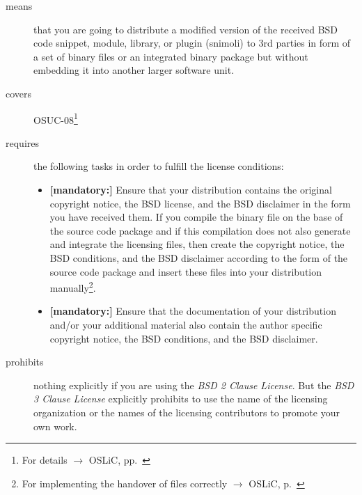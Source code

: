 \begin{description}
\item[means] that you are going to distribute a modified version of the received
BSD code snippet, module, library, or plugin (snimoli) to 3rd parties in form
of a set of binary files or an integrated binary package but without embedding
it into another larger software unit.
\item[covers] OSUC-08\footnote{For details $\rightarrow$ OSLiC, pp.\ \pageref{OSUC-08-DEF}}
\item[requires] the following tasks in order to fulfill the license conditions:
\begin{itemize}
   \item  \textbf{[mandatory:]} Ensure that your distribution contains the
  original copyright notice, the BSD license, and the BSD disclaimer in the form
  you have received them. If you compile the binary file on the base of the
  source code package and if this compilation does not also generate and
  integrate the licensing files, then create the copyright notice, the BSD
  conditions, and the BSD disclaimer according to the form of the source code
  package and insert these files into your distribution manually\footnote{For
  implementing the handover of files correctly $\rightarrow$ OSLiC, p.\ 
  \pageref{DistributingFilesHint}}.
  \item  \textbf{[mandatory:]} Ensure that the documentation of your
  distribution and/or your additional material also contain the author specific
  copyright notice, the BSD conditions, and the BSD disclaimer.
\end{itemize}

\item[prohibits] nothing explicitly if you are using the \emph{BSD 2 Clause
License}. But the \emph{BSD 3 Clause License} explicitly prohibits to use the
name of the licensing organization or the names of the licensing contributors to
promote your own work.

\end{description}

